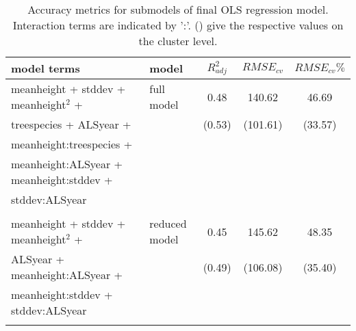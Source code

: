 \begin{table*}[!htbp]
	\begin{center}
	\caption{Accuracy metrics for submodels of final OLS regression model. Interaction terms are indicated by ':'. () give the respective values on the cluster level.} 
	\label{tab:modacc_modterms}
    {\small %
	\begin{tabular}{llccc}
  \hline
model terms & model & $R^2_{adj}$ & $RMSE_{cv}$ & $RMSE_{cv}\%$ \\ 
  \hline
meanheight + stddev + meanheight$^2$ +  & full model &  0.48 & 140.62  & 46.69 \\
treespecies + ALSyear + & & (0.53) &  (101.61) & (33.57) \\ 
meanheight:treespecies + \\ meanheight:ALSyear + meanheight:stddev + \\ stddev:ALSyear &&& \\ \\
meanheight + stddev + meanheight$^2$ + & reduced model  & 0.45  & 145.62 & 48.35 \\
ALSyear + meanheight:ALSyear + & & (0.49) & (106.08) & (35.40) \\
meanheight:stddev + stddev:ALSyear &&& \\ \\
\hline
\hline
\end{tabular}
}%
\end{center}
\end{table*}

